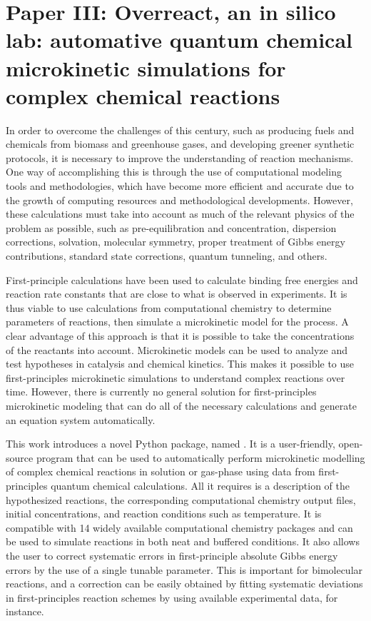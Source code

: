 \chapter{Paper III:\@
  Overreact,
  an in silico lab:
  \linebreak automative quantum chemical microkinetic simulations
  for complex chemical reactions
 }%
\label{ch:paper3}

\begin{citacao}
\end{citacao}

In order to overcome the challenges of this century,
such as producing fuels and chemicals from biomass and greenhouse gases,
and developing greener synthetic protocols,
it is necessary to improve the understanding of reaction mechanisms.
One way of accomplishing this is through the use of computational modeling tools and methodologies,
which have become more efficient and accurate due to the growth of computing resources and methodological developments.
However,
these calculations must take into account as much of the relevant physics of the problem as possible,
such as pre-equilibration and concentration,
dispersion corrections,
solvation,
molecular symmetry,
proper treatment of Gibbs energy contributions,
standard state corrections,
quantum tunneling,
and others.

First-principle calculations have been used to calculate binding free energies
and reaction rate constants that are close to what is observed in experiments.
It is thus viable to use calculations from computational chemistry to determine parameters of reactions,
then simulate a microkinetic model for the process.
A clear advantage of this approach is that it is possible to take the concentrations of the reactants into account.
Microkinetic models can be used to analyze and test hypotheses in catalysis and chemical kinetics.
This makes it possible to use first-principles microkinetic simulations to understand complex reactions over time.
However,
there is currently no general solution for first-principles microkinetic modeling
that can do all of the necessary calculations and generate an equation system automatically.

This work introduces a novel Python package,
named \overreact.
It is a user-friendly,
open-source program that can be used
to automatically perform microkinetic modelling of complex chemical reactions in solution or gas-phase
using data from first-principles quantum chemical calculations.
All it requires is a description of the hypothesized reactions,
the corresponding computational chemistry output files,
initial concentrations,
and reaction conditions such as temperature.
It is compatible with 14 widely available computational chemistry packages
and can be used to simulate reactions in both neat and buffered conditions.
It also allows the user to correct systematic errors in first-principle absolute Gibbs energy errors
by the use of a single tunable parameter.
This is important for bimolecular reactions,
and a correction can be easily obtained by fitting systematic deviations
in first-principles reaction schemes by using available experimental data,
for instance.

